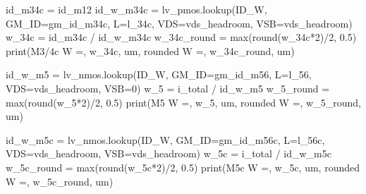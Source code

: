 \documentclass[
  a4paper,
  DIV=11,
  numbers=noendperiod]{scrartcl}
\newenvironment{Shaded}{\begin{snugshade}}{\end{snugshade}}
\newcommand{\BuiltInTok}[1]{\textcolor[rgb]{0.00,0.23,0.31}{#1}}
\newcommand{\DecValTok}[1]{\textcolor[rgb]{0.68,0.00,0.00}{#1}}
\newcommand{\FloatTok}[1]{\textcolor[rgb]{0.68,0.00,0.00}{#1}}
\newcommand{\NormalTok}[1]{\textcolor[rgb]{0.00,0.23,0.31}{#1}}
\newcommand{\OperatorTok}[1]{\textcolor[rgb]{0.37,0.37,0.37}{#1}}
\newcommand{\StringTok}[1]{\textcolor[rgb]{0.13,0.47,0.30}{#1}}
\begin{document}
\begin{tcolorbox}
\begin{Shaded}
\begin{Highlighting}[]
\NormalTok{id\_m34c }\OperatorTok{=}\NormalTok{ id\_m12}
\NormalTok{id\_w\_m34c }\OperatorTok{=}\NormalTok{ lv\_pmos.lookup(}\StringTok{\textquotesingle{}ID\_W\textquotesingle{}}\NormalTok{, GM\_ID}\OperatorTok{=}\NormalTok{gm\_id\_m34c, L}\OperatorTok{=}\NormalTok{l\_34c, VDS}\OperatorTok{=}\NormalTok{vds\_headroom, VSB}\OperatorTok{=}\NormalTok{vds\_headroom)}
\NormalTok{w\_34c }\OperatorTok{=}\NormalTok{ id\_m34c }\OperatorTok{/}\NormalTok{ id\_w\_m34c}
\NormalTok{w\_34c\_round }\OperatorTok{=} \BuiltInTok{max}\NormalTok{(}\BuiltInTok{round}\NormalTok{(w\_34c}\OperatorTok{*}\DecValTok{2}\NormalTok{)}\OperatorTok{/}\DecValTok{2}\NormalTok{, }\FloatTok{0.5}\NormalTok{) }
\BuiltInTok{print}\NormalTok{(}\StringTok{\textquotesingle{}M3/4c W =\textquotesingle{}}\NormalTok{, w\_34c, }\StringTok{\textquotesingle{}um, rounded W =\textquotesingle{}}\NormalTok{, w\_34c\_round, }\StringTok{\textquotesingle{}um\textquotesingle{}}\NormalTok{)}

\NormalTok{id\_w\_m5 }\OperatorTok{=}\NormalTok{ lv\_nmos.lookup(}\StringTok{\textquotesingle{}ID\_W\textquotesingle{}}\NormalTok{, GM\_ID}\OperatorTok{=}\NormalTok{gm\_id\_m56, L}\OperatorTok{=}\NormalTok{l\_56, VDS}\OperatorTok{=}\NormalTok{vds\_headroom, VSB}\OperatorTok{=}\DecValTok{0}\NormalTok{)}
\NormalTok{w\_5 }\OperatorTok{=}\NormalTok{ i\_total }\OperatorTok{/}\NormalTok{ id\_w\_m5}
\NormalTok{w\_5\_round }\OperatorTok{=} \BuiltInTok{max}\NormalTok{(}\BuiltInTok{round}\NormalTok{(w\_5}\OperatorTok{*}\DecValTok{2}\NormalTok{)}\OperatorTok{/}\DecValTok{2}\NormalTok{, }\FloatTok{0.5}\NormalTok{)}
\BuiltInTok{print}\NormalTok{(}\StringTok{\textquotesingle{}M5    W =\textquotesingle{}}\NormalTok{, w\_5, }\StringTok{\textquotesingle{}um, rounded W =\textquotesingle{}}\NormalTok{, w\_5\_round, }\StringTok{\textquotesingle{}um\textquotesingle{}}\NormalTok{)}

\NormalTok{id\_w\_m5c }\OperatorTok{=}\NormalTok{ lv\_nmos.lookup(}\StringTok{\textquotesingle{}ID\_W\textquotesingle{}}\NormalTok{, GM\_ID}\OperatorTok{=}\NormalTok{gm\_id\_m56c, L}\OperatorTok{=}\NormalTok{l\_56c, VDS}\OperatorTok{=}\NormalTok{vds\_headroom, VSB}\OperatorTok{=}\NormalTok{vds\_headroom)}
\NormalTok{w\_5c }\OperatorTok{=}\NormalTok{ i\_total }\OperatorTok{/}\NormalTok{ id\_w\_m5c}
\NormalTok{w\_5c\_round }\OperatorTok{=} \BuiltInTok{max}\NormalTok{(}\BuiltInTok{round}\NormalTok{(w\_5c}\OperatorTok{*}\DecValTok{2}\NormalTok{)}\OperatorTok{/}\DecValTok{2}\NormalTok{, }\FloatTok{0.5}\NormalTok{)}
\BuiltInTok{print}\NormalTok{(}\StringTok{\textquotesingle{}M5c   W =\textquotesingle{}}\NormalTok{, w\_5c, }\StringTok{\textquotesingle{}um, rounded W =\textquotesingle{}}\NormalTok{, w\_5c\_round, }\StringTok{\textquotesingle{}um\textquotesingle{}}\NormalTok{)}


\end{Highlighting}
\end{Shaded}
\end{tcolorbox}
\end{document}
